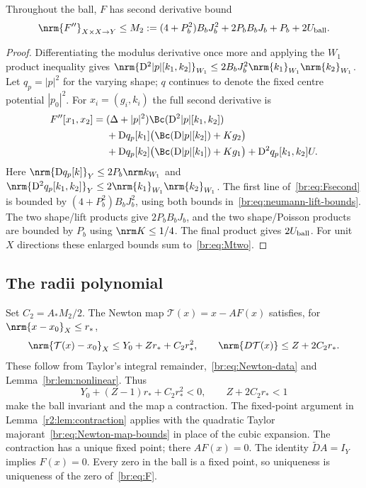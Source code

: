 \begin{lemma}\label{br:lem:nonlinear}
Throughout the ball, $F$ has second derivative bound
\begin{equation}\label{br:eq:Mtwo}
 \nrm{F''}_{X\times X\to Y}\le M_2
 :=(4+P_b^2)B_bJ_b^2+2P_bB_bJ_b+P_b+2U_{\rm ball}.
\end{equation}
\end{lemma}
\begin{proof}
Differentiating the modulus derivative once more and applying the
$W_1$ product inequality gives
$\nrm{\mathrm D^2|p|[k_1,k_2]}_{W_1}
\le2B_bJ_b^2\nrm{k_1}_{W_1}\nrm{k_2}_{W_1}$.
Let $q_p=|p|^2$ for the varying shape; $q$ continues to denote the fixed
centre potential $|p_0|^2$. For $x_i=(g_i,k_i)$ the full second derivative is
\begin{equation}\label{br:eq:Fsecond}
 \begin{split}
 F''[x_1,x_2]={}&(\Delta+|p|^2)\Bc(\mathrm D^2|p|[k_1,k_2])\\
 &+\mathrm Dq_p[k_1]\bigl(\Bc(\mathrm D|p|[k_2])+Kg_2\bigr)\\
 &+\mathrm Dq_p[k_2]\bigl(\Bc(\mathrm D|p|[k_1])+Kg_1\bigr)
   +\mathrm D^2q_p[k_1,k_2]U.
 \end{split}
\end{equation}
Here $\nrm{\mathrm Dq_p[k]}_Y\le2P_b\nrm k_{W_1}$ and
$\nrm{\mathrm D^2q_p[k_1,k_2]}_Y\le2\nrm{k_1}_{W_1}\nrm{k_2}_{W_1}$.
The first line of~\eqref{br:eq:Fsecond} is bounded by
$(4+P_b^2)B_bJ_b^2$, using both bounds
in~\eqref{br:eq:neumann-lift-bounds}. The two shape/lift products give
$2P_bB_bJ_b$, and the two shape/Poisson products are bounded by $P_b$
using $\nrm K\le1/4$. The final product gives $2U_{\rm ball}$.
For unit $X$ directions these enlarged bounds sum to~\eqref{br:eq:Mtwo}.
\end{proof}

\subsection{The radii polynomial}\label{br:sec:contraction}
Set $C_2=A_*M_2/2$. The Newton map $\mathcal T(x)=x-AF(x)$ satisfies,
for $\nrm{x-x_0}_X\le r_*$,
\begin{equation}\label{br:eq:Newton-map-bounds}
 \nrm{\mathcal T(x)-x_0}_X\le Y_0+Zr_*+C_2r_*^2,
 \qquad \nrm{D\mathcal T(x)}\le Z+2C_2r_*.
\end{equation}
These follow from Taylor's integral remainder,~\eqref{br:eq:Newton-data}
and Lemma~\ref{br:lem:nonlinear}. Thus
\begin{equation}\label{br:eq:radii}
 Y_0+(Z-1)r_*+C_2r_*^2<0,
 \qquad Z+2C_2r_*<1
\end{equation}
make the ball invariant and the map a contraction. The fixed-point
argument in Lemma~\ref{r2:lem:contraction} applies with the quadratic
Taylor majorant~\eqref{br:eq:Newton-map-bounds} in place of the cubic
expansion. The contraction has a unique fixed point;
there $AF(x)=0$. The identity $\widetilde DA=I_Y$ implies $F(x)=0$.
Every zero in the ball is a fixed point, so uniqueness is uniqueness of
the zero of~\eqref{br:eq:F}.

